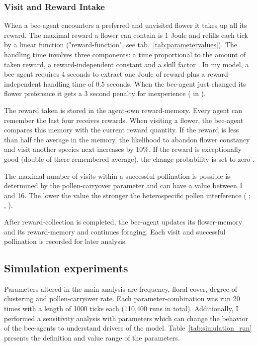 \subsubsection*{Visit and Reward Intake}

When a bee-agent encounters a preferred and unvisited flower it takes up all its reward. The maximal reward a flower can contain is 1 Joule and refills each tick by a linear function ("reward-function", see tab.~\ref{tab:parametervalues}). The handling time involves three components: a time proportional to the amount of taken reward, a reward-independent constant and a skill factor \citep{kunin1996pollinator}. In my model, a bee-agent requires 4 seconds to extract one Joule of reward plus a reward-independent handling time of 0.5 seconds. When the bee-agent just changed its flower preference it gets a 3 second penalty for inexperience (\citealt{roubik1992ecology} in  \citealt{kunin1996pollinator}).

The reward taken is stored in the agent-own reward-memory. Every agent can remember the last four receives rewards. When visiting a flower, the bee-agent compares this memory with the current reward quantity. If the reward is less than half the average in the memory, the likelihood to abandon flower constancy and visit another species next increases by 10\%. If the reward is exceptionally good (double of there remembered average), the change probability is set to zero  \citep{chittka1997foraging, keasar1996innate}. 

The maximal number of visits within a successful pollination is possible is determined by the pollen-carryover parameter and can have a value between 1 and 16. The lower the value the stronger the heterospecific pollen interference ( \citealt{campbell1986predicting}; \citealt{benadi2012population},  \citealt{montgomery2009pollen}).

After reward-collection is completed, the bee-agent updates its flower-memory and its reward-memory and continues foraging. Each visit and successful pollination is recorded for later analysis. 


\subsection*{Simulation experiments}

Parameters altered in the main analysis are frequency, floral cover, degree of clustering and pollen-carryover rate. Each parameter-combination was run 20 times with a length of 1000 ticks each (110,400 runs in total). Additionally, I performed a sensitivity analysis with parameters which can change the behavior of the bee-agents to understand drivers of the model. Table~\ref{tab:simulation_run} presents the definition and value range of the parameters.
 


